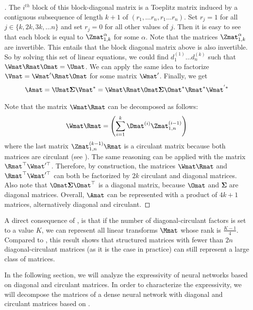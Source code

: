 \begin{proof}[]
\noindent
The $i^{th}$ block of this block-diagonal matrix is a Toeplitz matrix induced by a contiguous subsequence of length $k+1$ of $(r_1,\ldots r_n,r_1 \ldots r_n)$.
Set $r_{j}=1$ for all $j\in\{k,2k,3k,\ldots n\}$ and set $r_{j}=0$ for all other values of $j$.
Then it is easy to see that each block is equal to $\Zmat^\alpha_{1,k}$ for some $\alpha$.
Note that the matrices $\Zmat^\alpha_{1,k}$ are invertible.
This entails that the block diagonal matrix above is also invertible.
So by solving this set of linear equations, we could find $d_1^{(1)} \ldots d_n^{(k)}$ such that $\Wmat\Rmat\Omat=\Umat$.
We can apply the same idea to factorize $\Vmat = \Wmat' \Rmat \Omat$ for some matrix $\Wmat'$.
Finally, we get 
\begin{equation}
  \Amat = \Umat \mathbf{\Sigma} \Vmat^* = \Wmat\Rmat\Omat \mathbf{\Sigma} \Omat^* \Rmat^* \Wmat^{'*}
\end{equation}

\noindent
Note that the matrix $\Wmat\Rmat$ can be decomposed as follows:
\begin{equation}
  \Wmat\Rmat = \left( \sum_{i=1}^{k} \Dmat^{(i)} \Zmat_{1,n}^{(i-1)} \right)
\end{equation}
where the last matrix $\Zmat_{1,n}^{(k-1)} \Rmat$ is a circulant matrix because both matrices are circulant (see ).
The same reasoning can be applied with the matrix $\Rmat^\top\Wmat'^\top$.
Therefore, by construction, the matrices $\Wmat\Rmat$ and $\Rmat^\top\Wmat'^\top$ can both be factorized by $2k$ circulant and diagonal matrices.
Also note that $\Omat \mathbf{\Sigma} \Omat^\top$ is a diagonal matrix, because $\Omat$ and $\mathbf{\Sigma}$ are diagonal matrices.
Overall, $\Amat$ can be represented with a product of $4k+1$ matrices, alternatively diagonal and circulant.
\end{proof}

A direct consequence of , is that if the number of diagonal-circulant factors is set to a value $K$, we can represent all linear transforms $\Mmat$ whose rank is $\frac{K - 1}{4}$.
Compared to \citet{huhtanen2015factoring}, this result shows that structured matrices with fewer than $2n$ diagonal-circulant matrices (as it is the case in practice) can still represent a large class of matrices.

In the following section, we will analyze the expressivity of neural networks based on diagonal and circulant matrices.
In order to characterize the expressivity, we will decompose the matrices of a dense neural network with diagonal and circulant matrices based on .


